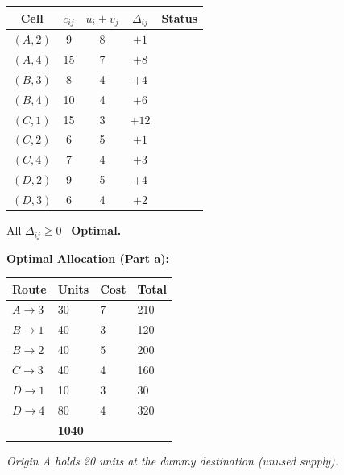\documentclass[12pt]{article}
\begin{document}
\begin{center}
\renewcommand{\arraystretch}{1.3}
\begin{tabular}{|c|c|c|c|c|}
  \hline
  \rowcolor{primary}
  {\color{white}\textbf{Cell}} &
  {\color{white}$c_{ij}$} &
  {\color{white}$u_i+v_j$} &
  {\color{white}$\Delta_{ij}$} &
  {\color{white}\textbf{Status}} \\
  \hline
  $(A,2)$ & 9 & 8 & $+1$ & \\
  \hline
  $(A,4)$ & 15 & 7 & $+8$ & \\
  \hline
  $(B,3)$ & 8 & 4 & $+4$ & \\
  \hline
  $(B,4)$ & 10 & 4 & $+6$ & \\
  \hline
  $(C,1)$ & 15 & 3 & $+12$ & \\
  \hline
  $(C,2)$ & 6 & 5 & $+1$ & \\
  \hline
  $(C,4)$ & 7 & 4 & $+3$ & \\
  \hline
  $(D,2)$ & 9 & 5 & $+4$ & \\
  \hline
  $(D,3)$ & 6 & 4 & $+2$ & \\
  \hline
\end{tabular}
\end{center}

All $\Delta_{ij} \geq 0$ \textrightarrow\ \textbf{Optimal.}

\begin{answerbox}
\textbf{Optimal Allocation (Part a):}
\begin{center}
\renewcommand{\arraystretch}{1.35}
\begin{tabular}{|C{2.8cm}|C{2.4cm}|C{2cm}|C{2.6cm}|}
  \hline
  \textbf{Route} & \textbf{Units} & \textbf{Cost} & \textbf{Total} \\
  \hline
  $A \to 3$ & 30 & 7 & 210 \\
  \hline
  $B \to 1$ & 40 & 3 & 120 \\
  \hline
  $B \to 2$ & 40 & 5 & 200 \\
  \hline
  $C \to 3$ & 40 & 4 & 160 \\
  \hline
  $D \to 1$ & 10 & 3 & 30 \\
  \hline
  $D \to 4$ & 80 & 4 & 320 \\
  \hline
   & \Large\textbf{1040} \\
  \hline
\end{tabular}
\end{center}
\textit{Origin A holds 20 units at the dummy destination (unused supply).}
\end{answerbox}
\end{document}
